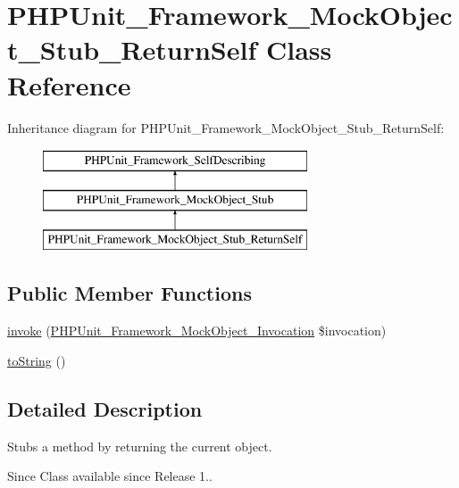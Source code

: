 \hypertarget{class_p_h_p_unit___framework___mock_object___stub___return_self}{}\section{P\+H\+P\+Unit\+\_\+\+Framework\+\_\+\+Mock\+Object\+\_\+\+Stub\+\_\+\+Return\+Self Class Reference}
\label{class_p_h_p_unit___framework___mock_object___stub___return_self}
Inheritance diagram for P\+H\+P\+Unit\+\_\+\+Framework\+\_\+\+Mock\+Object\+\_\+\+Stub\+\_\+\+Return\+Self\+:\begin{figure}[H]
\begin{center}
\leavevmode
\includegraphics[height=3.000000cm]{class_p_h_p_unit___framework___mock_object___stub___return_self}
\end{center}
\end{figure}
\subsection*{Public Member Functions}
\begin{DoxyCompactItemize}
\item 
\mbox{\hyperlink{class_p_h_p_unit___framework___mock_object___stub___return_self_af2fc26e6704e08d95f2ea1d9c5ffb865}{invoke}} (\mbox{\hyperlink{interface_p_h_p_unit___framework___mock_object___invocation}{P\+H\+P\+Unit\+\_\+\+Framework\+\_\+\+Mock\+Object\+\_\+\+Invocation}} \$invocation)
\item 
\mbox{\hyperlink{class_p_h_p_unit___framework___mock_object___stub___return_self_a5558c5d549f41597377fa1ea8a1cefa3}{to\+String}} ()
\end{DoxyCompactItemize}


\subsection{Detailed Description}
Stubs a method by returning the current object.

\begin{DoxySince}{Since}
Class available since Release 1.. 
\end{DoxySince}


